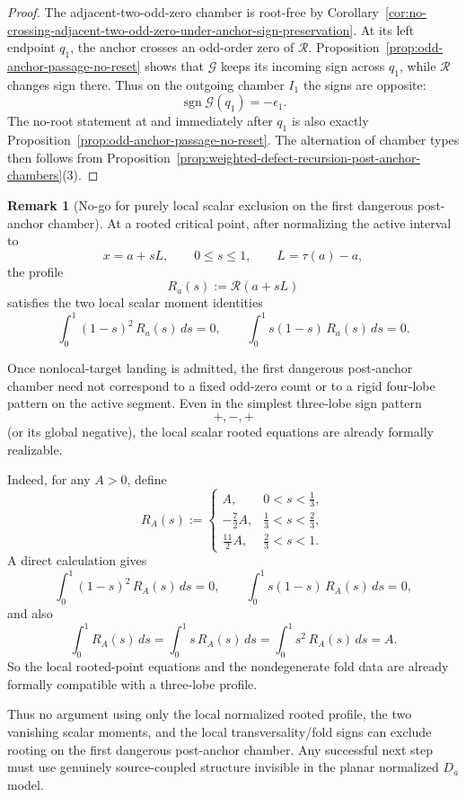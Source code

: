 \documentclass[11pt,a4paper]{amsart}
\theoremstyle{plain}
\theoremstyle{definition}
\newtheorem{remark}[theorem]{Remark}
\begin{document}
\begin{proof}
The adjacent-two-odd-zero chamber is root-free by
Corollary~\ref{cor:no-crossing-adjacent-two-odd-zero-under-anchor-sign-preservation}.
At its left endpoint $q_1$, the anchor crosses an odd-order zero of
$\mathcal R$. Proposition~\ref{prop:odd-anchor-passage-no-reset} shows that
$\mathscr G$ keeps its incoming sign across $q_1$, while $\mathcal R$ changes
sign there. Thus on the outgoing chamber $I_1$ the signs are opposite:
\[
\operatorname{sgn}\mathscr G(q_1)=-\epsilon_1.
\]
The no-root statement at and immediately after $q_1$ is also exactly
Proposition~\ref{prop:odd-anchor-passage-no-reset}. The alternation of chamber
types then follows from
Proposition~\ref{prop:weighted-defect-recursion-post-anchor-chambers}(3).
\end{proof}

\begin{remark}[No-go for purely local scalar exclusion on the first dangerous post-anchor chamber]
\label{rem:no-go-local-scalar-first-dangerous-chamber}
At a rooted critical point, after normalizing the active interval to
\[
x=a+sL,
\qquad
0\le s\le 1,
\qquad
L=\tau(a)-a,
\]
the profile
\[
R_a(s):=\mathcal R(a+sL)
\]
satisfies the two local scalar moment identities
\[
\int_0^1 (1-s)^2\,R_a(s)\,ds=0,
\qquad
\int_0^1 s(1-s)\,R_a(s)\,ds=0.
\]

Once nonlocal-target landing is admitted, the first dangerous post-anchor
chamber need not correspond to a fixed odd-zero count or to a rigid four-lobe
pattern on the active segment. Even in the simplest three-lobe sign pattern
\[
+,-,+
\]
(or its global negative), the local scalar rooted equations are already
formally realizable.

Indeed, for any $A>0$, define
\[
R_A(s):=
\begin{cases}
A, & 0<s<\frac13,\\[4pt]
-\frac72 A, & \frac13<s<\frac23,\\[4pt]
\frac{11}{2}A, & \frac23<s<1.
\end{cases}
\]
A direct calculation gives
\[
\int_0^1 (1-s)^2\,R_A(s)\,ds=0,
\qquad
\int_0^1 s(1-s)\,R_A(s)\,ds=0,
\]
and also
\[
\int_0^1 R_A(s)\,ds
=
\int_0^1 s\,R_A(s)\,ds
=
\int_0^1 s^2\,R_A(s)\,ds
=
A.
\]
So the local rooted-point equations and the nondegenerate fold data are already
formally compatible with a three-lobe profile.

Thus no argument using only the local normalized rooted profile, the two
vanishing scalar moments, and the local transversality/fold signs can exclude
rooting on the first dangerous post-anchor chamber. Any successful next step
must use genuinely source-coupled structure invisible in the planar normalized
$D_a$ model.
\end{remark}
\end{document}
